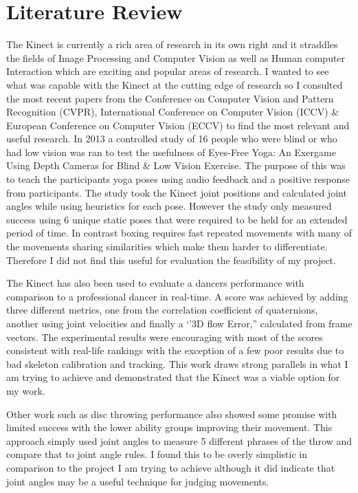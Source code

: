 \section{Literature Review}
The Kinect is currently a rich area of research in its own right and it straddles the fields of Image Processing and Computer Vision as well as Human computer Interaction which are exciting and popular areas of research. I wanted to see what was capable with the Kinect at the cutting edge of research so I consulted the most recent papers from the Conference on Computer Vision and Pattern Recognition (CVPR), International Conference on Computer Vision (ICCV) \& European Conference on Computer Vision (ECCV) to find the most relevant and useful research.
In 2013 a controlled study of 16 people who were blind or who had low vision was ran to test the usefulness of Eyes-Free Yoga: An Exergame Using Depth Cameras for Blind \& Low Vision Exercise. The purpose of this was to teach the participants yoga poses using audio feedback and a positive response from participants.\cite{Rector2013} The study took the Kinect joint positions and calculated joint angles while using heuristics for each pose. However the study only measured success using 6 unique static poses that were required to be held for an extended period of time. In contrast boxing requires fast repeated movements with many of the movements sharing similarities which make them harder to differentiate. Therefore I did not find this useful for evaluation the feasibility of my project.

The Kinect has also been used to evaluate a dancers performance with comparison to a professional dancer in real-time\cite{Alexiadis2011}. A score was achieved by adding three different metrics, one from the correlation coefficient of quaternions, another using joint velocities and finally a `'3D flow Error,'' calculated from frame vectors.\newline
The experimental results were encouraging with most of the scores consistent with real-life rankings with the exception of a few poor results due to bad skeleton calibration and tracking. This work draws strong parallels in what I am trying to achieve and demonstrated that the Kinect was a viable option for my work.

Other work such as disc throwing performance\cite{Yamaoka2013} also showed some promise with limited success with the lower ability groups improving their movement. This approach simply used joint angles to measure 5 different phrases of the throw and compare that to joint angle rules. I found this to be overly simplistic in comparison to the project I am trying to achieve although it did indicate that joint angles may be a useful technique for judging movements.
\newline

